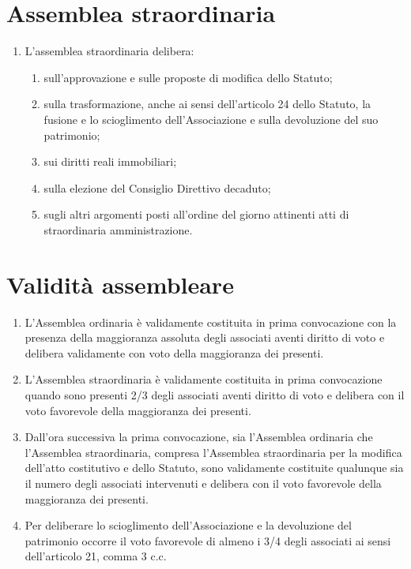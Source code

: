 \documentclass{djtsdoc}
\begin{document}
	\section{Assemblea straordinaria}
	\begin{enumerate}
		\item L'assemblea straordinaria delibera:
		\begin{enumerate}
			\item sull'approvazione e sulle proposte di modifica dello Statuto;
			\item sulla trasformazione, anche ai sensi dell'articolo 24 dello Statuto, la fusione e lo scioglimento dell'Associazione e sulla devoluzione del suo patrimonio;
			\item sui diritti reali immobiliari;
			\item sulla elezione del Consiglio Direttivo decaduto;
			\item sugli altri argomenti posti all'ordine del giorno attinenti atti di straordinaria amministrazione.
		\end{enumerate}
	\end{enumerate}
	
	\section{Validità assembleare}
	\begin{enumerate}
		\item L'Assemblea ordinaria è validamente costituita in prima convocazione con la presenza della maggioranza assoluta degli associati aventi diritto di voto e delibera validamente con voto della maggioranza dei presenti.
		\item L'Assemblea straordinaria è validamente costituita in prima convocazione quando sono presenti 2/3 degli associati aventi diritto di voto e delibera con il voto favorevole della maggioranza dei presenti.
		\item Dall'ora successiva la prima convocazione, sia l'Assemblea ordinaria che l'Assemblea straordinaria, compresa l'Assemblea straordinaria per la modifica dell'atto costitutivo e dello Statuto,  sono validamente costituite qualunque sia il numero degli associati intervenuti e delibera con il voto favorevole della maggioranza dei presenti.
		\item Per deliberare lo scioglimento dell'Associazione e la devoluzione del patrimonio occorre il voto favorevole di almeno i 3/4 degli associati ai sensi dell'articolo 21, comma 3 c.c.
	\end{enumerate}
	
\end{document}

